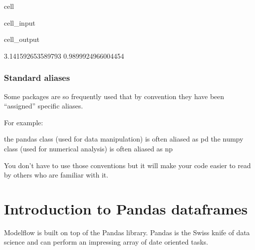 \documentclass[letterpaper,10pt,english]{jupyterBook}
\begin{document}
\begin{sphinxuseclass}{cell}\begin{sphinxVerbatimInput}

\begin{sphinxuseclass}{cell_input}
\begin{sphinxVerbatim}[commandchars=\\\{\}]
   
\end{sphinxVerbatim}

\end{sphinxuseclass}\end{sphinxVerbatimInput}
\begin{sphinxVerbatimOutput}

\begin{sphinxuseclass}{cell_output}
\begin{sphinxVerbatim}[commandchars=\\\{\}]
3.141592653589793
\PYGZhy{}0.9899924966004454
\end{sphinxVerbatim}

\end{sphinxuseclass}\end{sphinxVerbatimOutput}

\end{sphinxuseclass}

\subsection{Standard aliases}
\label{\detokenize{content/04_PythonEssentials/PythonPackagesEtc:standard-aliases}}
\sphinxAtStartPar
Some packages are so frequently used that by convention they have been “assigned” specific aliases.

\sphinxAtStartPar
For example:

\sphinxAtStartPar
the pandas class (used for data manipulation) is often aliased as pd 
the numpy class (used for numerical analysis) is often aliased as np 

\sphinxAtStartPar
You don’t have to use those conventions but it will make your code easier to read by others who are familiar with it.


\chapter{Introduction to Pandas dataframes}
\label{\detokenize{content/04_PythonEssentials/PythonPackagesEtc:introduction-to-pandas-dataframes}}
\sphinxAtStartPar
Modelflow is built on top of the Pandas library. Pandas is the Swiss knife of data science and can perform an impressing array of date oriented tasks.
\end{document}
